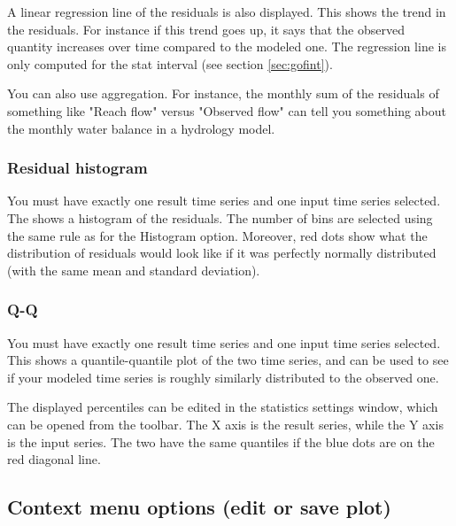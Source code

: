 \documentclass[11pt]{article}
\theoremstyle{definition}
\begin{document}
A linear regression line of the residuals is also displayed. This shows the trend in the residuals. For instance if this trend goes up, it says that the observed quantity increases over time compared to the modeled one. The regression line is only computed for the stat interval (see section \ref{sec:gofint}).

You can also use aggregation. For instance, the monthly sum of the residuals of something like "Reach flow" versus "Observed flow" can tell you something about the monthly water balance in a hydrology model.

\subsubsection{Residual histogram}

You must have exactly one result time series and one input time series selected. The shows a histogram of the residuals. The number of bins are selected using the same rule as for the Histogram option. Moreover, red dots show what the distribution of residuals would look like if it was perfectly normally distributed (with the same mean and standard deviation).

\subsubsection{Q-Q}

You must have exactly one result time series and one input time series selected. This shows a quantile-quantile plot of the two time series, and can be used to see if your modeled time series is roughly similarly distributed to the observed one.

The displayed percentiles can be edited in the statistics settings window, which can be opened from the toolbar. The X axis is the result series, while the Y axis is the input series. The two have the same quantiles if the blue dots are on the red diagonal line.

\subsection{Context menu options (edit or save plot)}
\end{document}
